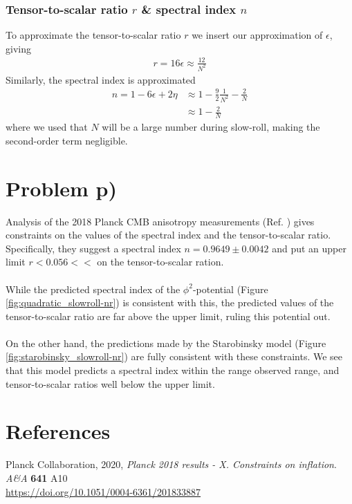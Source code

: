 \documentclass[reprint,english,notitlepage]{revtex4-1}  %
\numberwithin{equation}{section}
\begin{document}
\subsubsection{Tensor-to-scalar ratio $r$ \& spectral index $n$}
To approximate the tensor-to-scalar ratio $r$ we insert our approximation
of $\epsilon$, giving
\begin{align}
	r = 16\epsilon \approx \frac{12}{N^2}
\end{align}
Similarly, the spectral index is approximated
\begin{align}
	n = 1 - 6\epsilon + 2\eta &\approx 1 - \frac{9}{2}\frac{1}{N^2} - \frac{2}{N} \\
														&\approx 1 - \frac{2}{N}
\end{align}
where we used that $N$ will be a large number during slow-roll, making the
second-order term negligible.
\\
\section{Problem p)}
Analysis of the 2018 Planck CMB anisotropy measurements (Ref. \cite{Planck})
gives constraints on the values of the spectral index and the
tensor-to-scalar ratio. Specifically, they suggest a spectral index
$n = 0.9649 \pm 0.0042$ and put an upper limit $r<0.056<<$ on the tensor-to-scalar
ration.
\\ \\
While the predicted spectral index of the $\phi^2$-potential (Figure
\ref{fig:quadratic_slowroll-nr}) is consistent with this, the
predicted values of the tensor-to-scalar ratio are far above the upper limit,
ruling this potential out.
\\ \\
On the other hand, the predictions made by the Starobinsky model (Figure
\ref{fig:starobinsky_slowroll-nr}) are fully consistent with these
constraints. We see that this model predicts a spectral index within the
range observed range, and tensor-to-scalar ratios well below
the upper limit.

\section*{References}

\begin{itemize}
	Planck Collaboration, 2020,
	\textit{Planck 2018 results - X. Constraints on inflation}.
	\textit{A\&A} \textbf{641} A10 \\
	\url{https://doi.org/10.1051/0004-6361/201833887}
\end{itemize}
\end{document}
